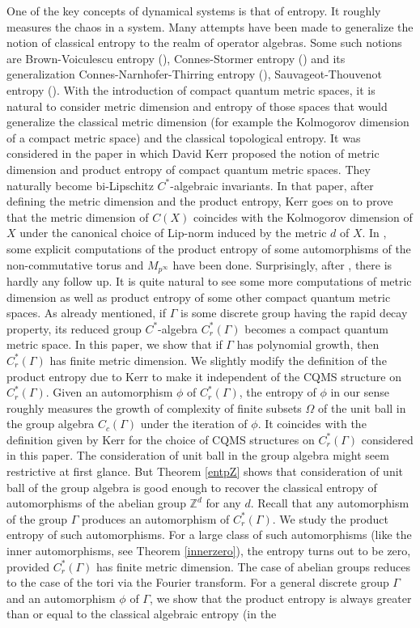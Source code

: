 \documentclass[a4paper,11pt,reqno]{amsart}
\theoremstyle{plain}
\theoremstyle{mainthmstyle}
\theoremstyle{named}
\numberwithin{equation}{section}
\begin{document}
\indent One of the key concepts of dynamical systems is that of entropy. It roughly measures the chaos in a system. Many attempts have been made to generalize the notion of classical entropy to the realm of operator algebras. Some such notions are Brown-Voiculescu entropy (\cites{Voiculescu, Brown}), Connes-Stormer entropy (\cites{Connesstormer}) and its generalization Connes-Narnhofer-Thirring entropy (\cite{CNT}), Sauvageot-Thouvenot entropy (\cite{Sauvageot}). With the introduction of compact quantum metric spaces, it is natural to consider metric dimension and entropy of those spaces that would generalize the classical metric dimension (for example the Kolmogorov dimension of a compact metric space) and the classical topological entropy. It was considered in the paper \cite{Kerr} in which David Kerr proposed the notion of metric dimension and product entropy of compact quantum metric spaces. They naturally become bi-Lipschitz $C^{\ast}$-algebraic invariants. In that paper, after defining the metric dimension and the product entropy, Kerr goes on to prove that the metric dimension of $C(X)$ coincides with the Kolmogorov dimension of $X$ under the canonical choice of Lip-norm induced by the metric $d$ of $X$. In \cite{Kerr}, some explicit computations of the product entropy of some automorphisms of the non-commutative torus and $M_{p^{\infty}}$ have been done. Surprisingly, after \cite{Kerr}, there is hardly any follow up. It is quite natural to see some more computations of metric dimension as well as product entropy of some other compact quantum metric spaces. As already mentioned, if $\Gamma$ is some discrete group having the rapid decay property, its reduced group $C^{\ast}$-algebra $C^{\ast}_{r}(\Gamma)$ becomes a compact quantum metric space. In this paper, we show that if $\Gamma$ has polynomial growth, then $C^{\ast}_{r}(\Gamma)$ has finite metric dimension. We slightly modify the definition of the product entropy due to Kerr to make it independent of the CQMS structure on $C^{\ast}_{r}(\Gamma)$. Given an automorphism $\phi$ of $C^{\ast}_{r}(\Gamma)$, the entropy of $\phi$ in our sense roughly measures the growth of complexity of finite subsets $\Omega$ of the unit ball in the group algebra $C_{c}(\Gamma)$ under the iteration of $\phi$. It coincides with the definition given by Kerr for the choice of CQMS structures on $C^{\ast}_{r}(\Gamma)$ considered in this paper. The consideration of unit ball in the group algebra might seem restrictive at first glance. But Theorem \ref{entpZ} shows that consideration of unit ball of the group algebra is good enough to recover the classical entropy of automorphisms of the abelian group $\mathbb{Z}^d$ for any $d$. Recall that any automorphism of the group $\Gamma$ produces an automorphism of $C^{\ast}_{r}(\Gamma)$. We study the product entropy of such automorphisms. For a large class of such automorphisms (like the inner automorphisms, see Theorem \ref{innerzero}), the entropy turns out to be zero, provided $C^{\ast}_{r}(\Gamma)$ has finite metric dimension. The case of abelian groups reduces to the case of the tori via the Fourier transform. For a general discrete group $\Gamma$ and an automorphism $\phi$ of $\Gamma$, we show that the product entropy is always greater than or equal to the classical algebraic entropy (in the 
\end{document}
